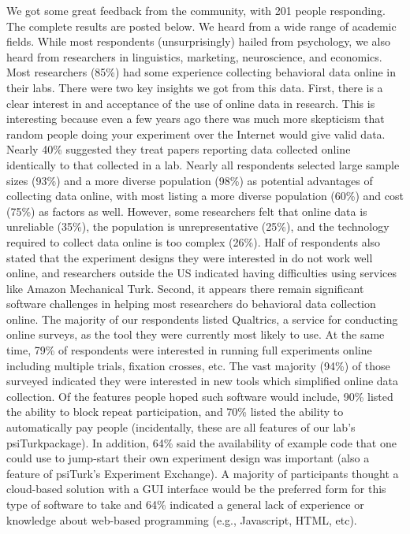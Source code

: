 \documentclass[jou,apacite]{apa6}
\begin{document}
We got some great feedback from the community, with 201 people responding.
The complete results are posted below.
We heard from a wide range of academic fields.
While most respondents (unsurprisingly) hailed from psychology, we also heard from researchers in linguistics, marketing, neuroscience, and economics.
Most researchers (85\%) had some experience collecting behavioral data online in their labs.
There were two key insights we got from this data.
First, there is a clear interest in and acceptance of the use of online data in research.
This is interesting because even a few years ago there was much more skepticism that random people doing your experiment over the Internet would give valid data.
Nearly 40\% suggested they treat papers reporting data collected online identically to that collected in a lab.
Nearly all respondents selected large sample sizes (93\%) and a more diverse population (98\%) as potential advantages of collecting data online, with most listing a more diverse population (60\%) and cost (75\%) as factors as well.
However, some researchers felt that online data is unreliable (35\%), the population is unrepresentative (25\%), and the technology required to collect data online is too complex (26\%).
Half of respondents also stated that the experiment designs they were interested in do not work well online, and researchers outside the US indicated having difficulties using services like Amazon Mechanical Turk.
Second, it appears there remain significant software challenges in helping most researchers do behavioral data collection online.
The majority of our respondents listed Qualtrics, a service for conducting online surveys, as the tool they were currently most likely to use.
At the same time, 79\% of respondents were interested in running full experiments online including multiple trials, fixation crosses, etc.
The vast majority (94\%) of those surveyed indicated they were interested in new tools which simplified online data collection.
Of the features people hoped such software would include, 90\% listed the ability to block repeat participation, and 70\% listed the ability to automatically pay people (incidentally, these are all features of our lab's psiTurkpackage).
In addition, 64\% said the availability of example code that one could use to jump-start their own experiment design was important (also a feature of psiTurk's Experiment Exchange).
A majority of participants thought a cloud-based solution with a GUI interface would be the preferred form for this type of software to take and 64\% indicated a general lack of experience or knowledge about web-based programming (e.g., Javascript, HTML, etc).
\end{document}
